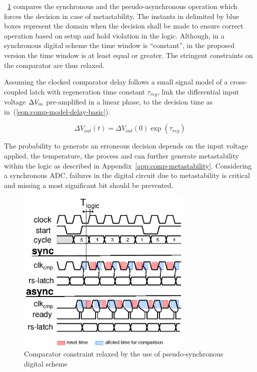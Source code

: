 \figurename~\ref{fig:sar-sync-async} compares the synchronous and the pseudo-asynchronous operation which forces the decision in case of metastability. The instants in delimited by blue boxes represent the domain when the decision shall be made to ensure correct operation based on setup and hold violation in the logic. Although, in a synchronous digital scheme the time window is ``constant'', in the proposed version the time window is at least equal or greater. The stringent constraints on the comparator are thus relaxed. 

Assuming the clocked comparator delay follows a small signal model of a cross-coupled latch with regeneration time constant \(\tau_{reg} \), link the differential input voltage \(\Delta V_{\rm in}\) pre-amplified in a linear phase, to the decision time as in~(\ref{eqn:comp-model-delay-basic}).

\begin{equation}
	\label{eqn:comp-model-delay-basic}
\Delta V_{out}(t) = \Delta V_{out}(0) \exp\left(\tau_{reg}\right)
\end{equation}

The probability to generate an erroneous decision depends on the input voltage applied, the temperature, the process and can further generate metastability within the logic as described in Appendix~\ref{app:comp-metastability}. Considering a synchronous ADC, failures in the digital circuit due to metastability is critical and missing a most significant bit should be prevented.

\begin{figure}[htp]
	\centering
	\includegraphics[width=0.75\textwidth]{Chapter4/Figs/sar-comp-constraint.ps}
	\caption{Comparator constraint relaxed by the use of pseudo-synchronous digital scheme}
	\label{fig:sar-sync-async}
\end{figure}

